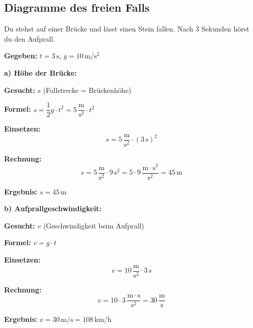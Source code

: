 \documentclass[11pt,a4paper]{article}
\begin{document}
\subsection{Diagramme des freien Falls}

\begin{center}
\end{center}

\begin{beispiel}
Du stehst auf einer Brücke und lässt einen Stein fallen. Nach 3 Sekunden hörst du den Aufprall.

\textbf{Gegeben:} $t = 3\,\mathrm{s}$, \quad $g = 10\,\mathrm{m/s^2}$

\vspace{0.3cm}
\textbf{a) Höhe der Brücke:}

\textbf{Gesucht:} $s$ (Fallstrecke = Brückenhöhe)

\textbf{Formel:} $s = \dfrac{1}{2} g \cdot t^2 = 5\,\dfrac{\mathrm{m}}{\mathrm{s}^2} \cdot t^2$

\textbf{Einsetzen:}
\[
s = 5\,\frac{\mathrm{m}}{\mathrm{s}^2} \cdot (3\,\mathrm{s})^2
\]

\textbf{Rechnung:}
\[
s = 5\,\frac{\mathrm{m}}{\mathrm{s}^2} \cdot 9\,\mathrm{s}^2 = 5 \cdot 9\,\frac{\mathrm{m} \cdot \mathrm{s}^2}{\mathrm{s}^2} = 45\,\mathrm{m}
\]

\textbf{Ergebnis:} $\boxed{s = 45\,\mathrm{m}}$

\vspace{0.3cm}
\textbf{b) Aufprallgeschwindigkeit:}

\textbf{Gesucht:} $v$ (Geschwindigkeit beim Aufprall)

\textbf{Formel:} $v = g \cdot t$

\textbf{Einsetzen:}
\[
v = 10\,\frac{\mathrm{m}}{\mathrm{s}^2} \cdot 3\,\mathrm{s}
\]

\textbf{Rechnung:}
\[
v = 10 \cdot 3\,\frac{\mathrm{m} \cdot \mathrm{s}}{\mathrm{s}^2} = 30\,\frac{\mathrm{m}}{\mathrm{s}}
\]

\textbf{Ergebnis:} $\boxed{v = 30\,\mathrm{m/s} = 108\,\mathrm{km/h}}$
\end{beispiel}
\end{document}
